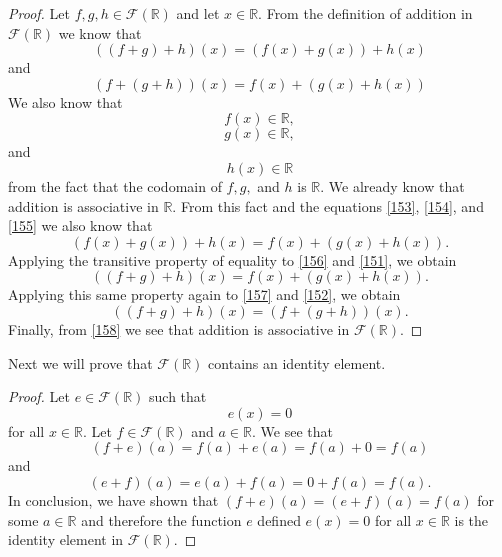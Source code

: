 \documentclass[11pt,a4paper]{article}
\begin{document}
\begin{proof}
Let $f,g,h\in\mathcal{F}(\mathbb{R})$ and let $x\in\mathbb{R}$. From the definition of addition in $\mathcal{F}(\mathbb{R})$ we know that
\begin{equation}\label{151}
((f+g)+h)(x) = (f(x)+g(x))+h(x)
\end{equation}
and
\begin{equation}\label{152}
(f+(g+h))(x) = f(x)+(g(x)+h(x))
\end{equation}
We also know that
\begin{equation}\label{153}
f(x) \in \mathbb{R},
\end{equation}
\begin{equation}\label{154}
g(x) \in \mathbb{R},
\end{equation}
and
\begin{equation}\label{155}
h(x) \in \mathbb{R}
\end{equation}
from the fact that the codomain of $f,g,$ and $h$ is $\mathbb{R}$.
We already know that addition is associative in $\mathbb{R}$. From this fact and the equations \eqref{153}, \eqref{154}, and \eqref{155} we also know that
\begin{equation}\label{156}
(f(x)+g(x))+h(x) = f(x)+(g(x)+h(x)).
\end{equation}
Applying the transitive property of equality to \eqref{156} and \eqref{151}, we obtain
\begin{equation}\label{157}
((f+g)+h)(x) = f(x)+(g(x)+h(x)).
\end{equation}
Applying this same property again to \eqref{157} and \eqref{152}, we obtain
\begin{equation}\label{158}
((f+g)+h)(x) = (f+(g+h))(x).
\end{equation}
Finally, from \eqref{158} we see that addition is associative in $\mathcal{F}(\mathbb{R})$.
\end{proof}
Next we will prove that $\mathcal{F}(\mathbb{R})$ contains an identity element.
\begin{proof}
Let $e\in\mathcal{F}(\mathbb{R})$ such that 
\begin{equation}
e(x) = 0
\end{equation}
for all $x\in\mathbb{R}$. Let $f\in\mathcal{F}(\mathbb{R})$ and $a\in\mathbb{R}$. We see that
\[(f+e)(a) = f(a)+e(a)=f(a)+0=f(a)\]
and
\[(e+f)(a) = e(a)+f(a)=0+f(a)=f(a).\]
In conclusion, we have shown that $(f+e)(a)=(e+f)(a)=f(a)$ for some $a\in\mathbb{R}$ and therefore the function $e$ defined $e(x)=0$ for all $x\in\mathbb{R}$ is the identity element in $\mathcal{F}(\mathbb{R})$.
\end{proof}
\end{document}

